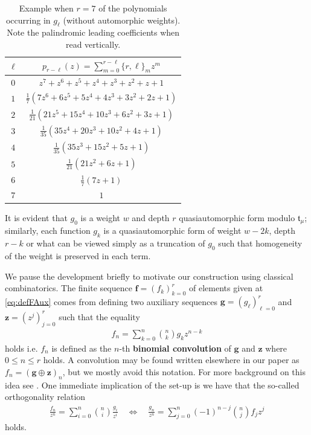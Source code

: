 \documentclass[11pt]{article}
\begin{document}
  \begin{table}[H]
        \centering
        {
        \def\arraystretch{1.20}
        \begin{tabular}{|c|c|}
             \hline
             $\ell $ & $ p_{r-\ell}(z) = \sum_{m=0}^{r-\ell} \{r,\ell\}_mz^m $  \\
             \hline
             $ 0 $ & $ z^7 + z^6 + z^5 + z^4 + z^3 + z^2 + z + 1 $   \\
             $ 1 $ &  $\frac{1}{7}\left( 7z^6 + 6z^5 +  5 z^4 + 4z^3 + 3z^2 + 2z + 1\right) $   \\
             $ 2 $ &   $\frac{1}{21}\left(21 z^5 + 15 z^4 + 10z^3+ 6z^2 +3z +1\right) $ \\
             $ 3 $ &   $\frac{1}{35}(35 z^4 + 20z^3 + 10z^2 + 4z +1) $ \\
             $ 4 $ &   $\frac{1}{35}(35 z^3 + 15 z^2 + 5z + 1) $ \\
             $ 5 $ &  $\frac{1}{21}(21z^2 + 6z + 1)$  \\
             $6 $ & $\frac{1}{7}(7z + 1)$ \\
             $7$ & $1$ \\ 
             \hline
        \end{tabular}
        }
        \caption{Example when $ r = 7 $ of the polynomials occurring in $ g_\ell $ (without automorphic weights). Note the palindromic leading coefficients when read vertically.}
        \label{tab:interimPolynomials}
    \end{table}

It is evident that $ g_0 $ is a weight $ w $ and depth $ r $ quasiautomorphic form modulo $ \mathfrak{t}_\mu $; similarly, each function $ g_k $ is a quasiautomorphic form of weight $ w-2k $, depth $ r-k  $ or what can be viewed simply as a truncation of $ g_0 $ such that homogeneity of the weight is preserved in each term. 
    

We pause the development briefly to motivate our construction using classical combinatorics. The finite sequence $ \mathbf{f} = (f_k)^r_{k=0} $ of elements given at \eqref{eq:defFAux} comes from defining two auxiliary sequences $ \mathbf{g} = (g_\ell)^r_{\ell =0}
 $ and $ \mathbf{z} = (z^j)^r_{j=0} $ such that the equality
    \begin{eqnarray}\label{ex:fAux}
        f_n = \sum_{k=0}^{n}\binom{n}{k}g_{k}{z^{n-k}}    
    \end{eqnarray}
holds i.e. $ f_n $ is defined as the $ n $-th \textbf{binomial convolution} of $ \mathbf{g} $ and $ \mathbf{z} $ where $ 0 \leq n \leq r $ holds. A convolution may be found written elsewhere in our paper as $ f_n = (\mathbf{g}\oplus\mathbf{z})_n $, but we mostly avoid this notation. For more background on this idea see \cite{grahamKnuthPatashnik1989}. One immediate implication of the set-up is we have that the so-called orthogonality relation
    \begin{eqnarray*}\label{eq:orthogonality}
        \frac{f_n}{z^n} = \sum_{i=0}^{n} \binom{n}{i}\frac{g_i}{z^{i}} \quad \Leftrightarrow \quad \frac{g_n}{z^n}= \sum_{j=0}^{n}(-1)^{n-j} \binom{n}{j}{f_j}{z^j} 
    \end{eqnarray*}
holds. 
\end{document}
